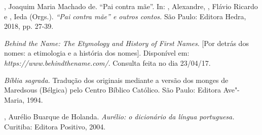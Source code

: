 \begin{Parskip}
, Joaquim Maria Machado de. ``Pai contra mãe''. In: ,
Alexandre, , Flávio Ricardo e , Ieda (Orgs.).
\emph{``Pai contra mãe'' e outros contos.} São Paulo: Editora Hedra,
2018, pp. 27-39.

\emph{Behind the Name: The Etymology and History of First Names}. [Por
detrás dos nomes: a etimologia e a história dos nomes]. Disponível em:
\emph{https://www.behindthename.com/}.
Consulta feita no dia 23/04/17.

\emph{Bíblia sagrada.} Tradução dos originais mediante a versão dos
monges de Maredsous (Bélgica) pelo Centro Bíblico Católico. São Paulo:
Editora Ave"-Maria, 1994.

, Aurélio Buarque de Holanda. \emph{Aurélio: o dicionário da
língua portuguesa.} Curitiba: Editora Positivo, 2004.
\end{Parskip}